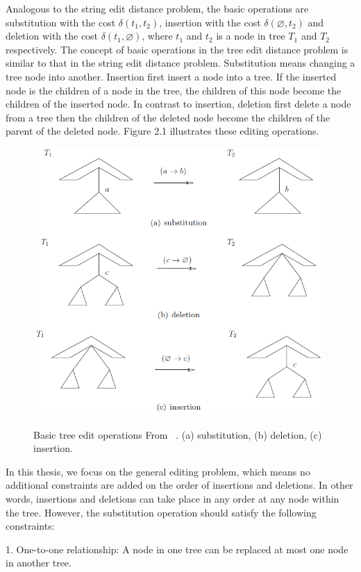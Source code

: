 Analogous to the string edit distance problem, the basic operations are substitution with the cost $\delta(t_1, t_2)$, insertion with the cost $\delta(\varnothing, t_2)$ and deletion with the cost $\delta(t_1, \varnothing)$, where $t_1$ and $t_2$ is a node in tree $T_1$ and $T_2$ respectively. The concept of basic operations in the tree edit distance problem is similar to that in the string edit distance problem. Substitution means changing a tree node into another. Insertion first insert a node into a tree. If the inserted node is the children of a node in the tree, the children of this node become the children of the inserted node. In contrast to insertion, deletion first delete a node from a tree then the children of the deleted node become the children of the parent of the deleted node. Figure 2.1 illustrates these editing operations.

\begin{figure}
		\centering
		\includegraphics[width=11cm,clip]{Figures/TreeEditingOperation}
		\label{Basic tree edit operations} 
		\caption{Basic tree edit operations From ~\cite{chen2015review}. (a) substitution, (b) deletion, (c) insertion.}
\end{figure}

In this thesis, we focus on the general editing problem, which means no additional constraints are added on the order of insertions and deletions. In other words, insertions and deletions can take place in any order at any node within the tree. However, the substitution operation should satisfy the following constraints:

1. One-to-one relationship: A node in one tree can be replaced at most one node in another tree. 

